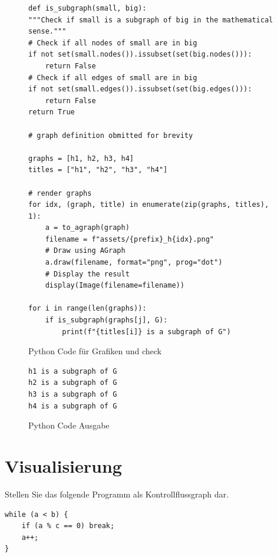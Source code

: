 \documentclass[a4paper,11pt]{report}
\begin{document}
\begin{figure}
    \centering
    \begin{verbatim}
def is_subgraph(small, big):
"""Check if small is a subgraph of big in the mathematical sense."""
# Check if all nodes of small are in big
if not set(small.nodes()).issubset(set(big.nodes())):
    return False
# Check if all edges of small are in big
if not set(small.edges()).issubset(set(big.edges())):
    return False
return True

# graph definition obmitted for brevity

graphs = [h1, h2, h3, h4]
titles = ["h1", "h2", "h3", "h4"]

# render graphs
for idx, (graph, title) in enumerate(zip(graphs, titles), 1):
    a = to_agraph(graph)
    filename = f"assets/{prefix}_h{idx}.png"
    # Draw using AGraph
    a.draw(filename, format="png", prog="dot")
    # Display the result
    display(Image(filename=filename))

for i in range(len(graphs)):
    if is_subgraph(graphs[j], G):
        print(f"{titles[i]} is a subgraph of G")
    \end{verbatim}
    \caption{Python Code für Grafiken und check}
    \label{fig:is_subgraph}
\end{figure}
\begin{figure}
    \centering
    \begin{verbatim}
h1 is a subgraph of G
h2 is a subgraph of G
h3 is a subgraph of G
h4 is a subgraph of G
    \end{verbatim}
    \caption{Python Code Ausgabe}
    \label{fig:is_subgraph_output}
\end{figure}

\newpage

\chapter{Visualisierung}

Stellen Sie das folgende Programm als Kontrollflussgraph dar. 

\begin{verbatim}
while (a < b) {
    if (a % c == 0) break;
    a++;
}
\end{verbatim}
\end{document}
